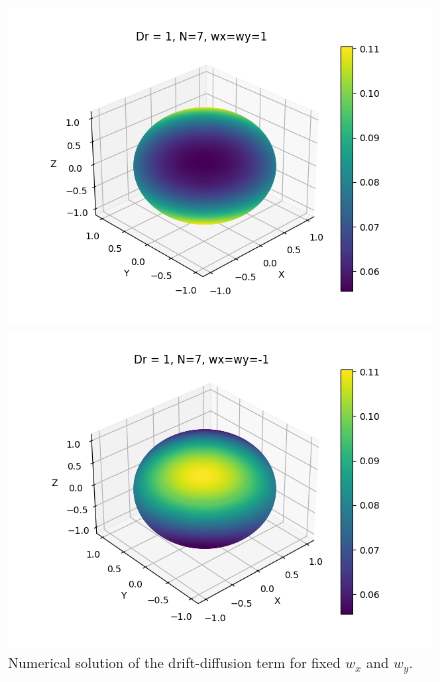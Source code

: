 \begin{frame}
	\scriptsize
	\begin{figure}[H]
	\centering
	\begin{minipage}{0.4\textwidth}
		\includegraphics[scale=0.28]{Bilder_wxwy/Sol_onSphere_wx=1=wy_Dr=1_N=7}
	\end{minipage}
	\hfill 
	\begin{minipage}{0.4\textwidth}
		\includegraphics[scale=0.28]{Bilder_wxwy/Sol_onSphere_wx=-1=wy_Dr=1_N=7}
	\end{minipage}
   \caption{Numerical solution of the drift-diffusion term for fixed $w_x$ and $w_y$.}
	\begin{minipage}{0.4\textwidth}

\end{minipage}
\end{figure}
\end{frame}
